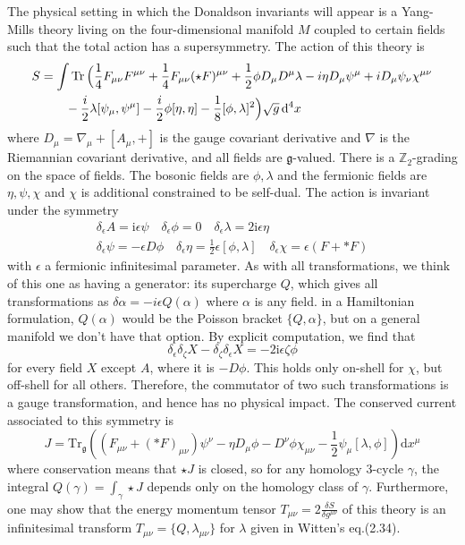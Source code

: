 The physical setting in which the Donaldson invariants will appear is a
Yang-Mills theory living on the four-dimensional manifold $M$ coupled to certain
fields such that the total action has a supersymmetry. The action of this theory
is 
\begin{align*}
	S &= \int \Tr \Big(\frac{1}{4}F_{\mu\nu}F^{\mu\nu} +\frac{1}{4}F_{\mu\nu}(\star
F)^{\mu\nu} +\frac{1}{2}\phi D_\mu D^\mu\lambda - i\eta D_\mu\psi^\mu +
iD_\mu\psi_\nu\chi^{\mu\nu} \\ 
	  &\qquad - \frac{i}{2}\lambda[\psi_\mu,\psi^\mu]-\frac{i}{2}\phi[\eta,\eta]-\frac{1}{8}[\phi,\lambda]^2\Big)\sqrt{g} \odif[order=4]{x}
\end{align*}
where $D_\mu = \nabla_\mu + [A_\mu,+]$ is the gauge covariant derivative and
$\nabla$ is the Riemannian covariant derivative, and all fields are
$\mathfrak{g}$-valued. There is a  $\mathbb{Z}_2$-grading on the space of
fields. The bosonic fields are $\phi,\lambda$ and the fermionic fields are
$\eta,\psi,\chi$ and  $\chi$ is additional constrained to be self-dual. The
action is invariant under the symmetry 
\begin{align*}
	\delta_\epsilon A = \mathrm{i}\epsilon\psi \quad \delta_\epsilon\phi = 0
	\quad \delta_\epsilon\lambda = 2\mathrm{i}\epsilon\eta \\
	\delta_\epsilon\psi = -\epsilon D\phi \quad \delta_\epsilon\eta =
	\frac{1}{2}\epsilon[\phi,\lambda] \quad \delta_\epsilon \chi = \epsilon(F +
	\ast F) 
\end{align*}
with $\epsilon$ a fermionic infinitesimal parameter. As with all
transformations, we think of this one as having a generator: its supercharge
$Q$, which gives all transformations as  $\delta \alpha=-i\epsilon Q(\alpha)$
where $\alpha$ is any field. in a Hamiltonian formulation,  $Q(\alpha)$ would be
the Poisson bracket  $\{Q,\alpha\}$, but on a general manifold we don't have
that option. By explicit computation, we find that 
\[
	\delta_\epsilon\delta_\zeta X - \delta_\zeta\delta_\epsilon X =
	-2\mathrm{i}\epsilon\zeta\phi
\] 
for every field $X$ except  $A$, where it is  $-D\phi$. This holds only on-shell
for  $\chi$, but off-shell for all others. Therefore, the commutator of two such
transformations is a gauge transformation, and hence has no physical impact. The
conserved current associated to this symmetry is 
 \[
	 J = \mathrm{Tr}_\mathfrak{g}\left((F_{\mu\nu} + (\ast F)_{\mu\nu})\psi^\nu
		 - \eta D_\mu \phi - D^\nu\phi \chi_{\mu\nu} -
	 \frac{1}{2}\psi_\mu[\lambda,\phi]\right)\mathrm{d}x^\mu
\] 
where conservation means that $\star J$ is closed, so for any homology 3-cycle
 $\gamma$, the integral  $Q(\gamma) = \int_\gamma \star J$ depends only on the
 homology class of  $\gamma$. Furthermore, one may show that the energy momentum
 tensor  $T_{\mu\nu}= 2 \frac{\delta S}{\delta g^{\mu\nu}}$ of this theory is an
 infinitesimal transform $T_{\mu\nu}=\{Q,\lambda_{\mu\nu}\}$ for $\lambda$ given
 in Witten's eq.(2.34). 

